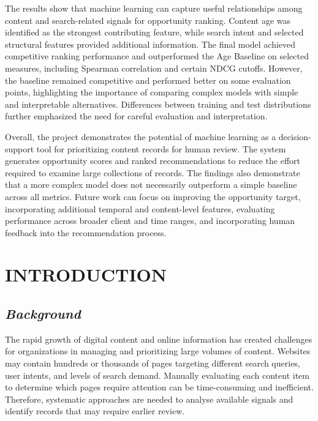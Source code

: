 \documentclass[12pt,a4paper]{report}
\begin{document}
The results show that machine learning can capture useful relationships among content and search-related signals for opportunity ranking. Content age was identified as the strongest contributing feature, while search intent and selected structural features provided additional information. The final model achieved competitive ranking performance and outperformed the Age Baseline on selected measures, including Spearman correlation and certain NDCG cutoffs. However, the baseline remained competitive and performed better on some evaluation points, highlighting the importance of comparing complex models with simple and interpretable alternatives. Differences between training and test distributions further emphasized the need for careful evaluation and interpretation.

Overall, the project demonstrates the potential of machine learning as a decision-support tool for prioritizing content records for human review. The system generates opportunity scores and ranked recommendations to reduce the effort required to examine large collections of records. The findings also demonstrate that a more complex model does not necessarily outperform a simple baseline across all metrics. Future work can focus on improving the opportunity target, incorporating additional temporal and content-level features, evaluating performance across broader client and time ranges, and incorporating human feedback into the recommendation process.


\listoftables
{}

\listoffigures
{}

\tableofcontents

\newpage
{}
\setcounter{page}{1}

\chapter{INTRODUCTION}

\section{\textit{Background}}
The rapid growth of digital content and online information has created challenges for organizations in managing and prioritizing large volumes of content. Websites may contain hundreds or thousands of pages targeting different search queries, user intents, and levels of search demand. Manually evaluating each content item to determine which pages require attention can be time-consuming and inefficient. Therefore, systematic approaches are needed to analyse available signals and identify records that may require earlier review.
\end{document}
